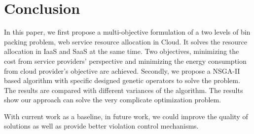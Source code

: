 \section{Conclusion}
\label{sec:con}

In this paper, we first propose a multi-objective formulation of a two levels of bin packing problem, web service resource allocation in Cloud. It solves the resource allocation in IaaS and SaaS at the same time. Two objectives, minimizing the cost from service providers' perspective and minimizing the energy consumption from cloud provider's objective are achieved. Secondly, we propose a NSGA-II based algorithm with specific designed genetic operators to solve the problem. The results are
compared with different variances of the algorithm. The results show our approach can solve the very complicate
optimization problem.

With current work as a baseline, in future work, we could improve the quality of solutions as well as provide better violation control mechanisms.

